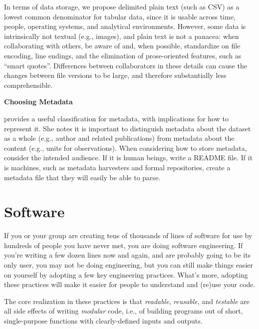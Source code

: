\documentclass[10pt]{article}
\begin{document}
In terms of data storage, we propose delimited plain text (such as CSV)
as a lowest common denominator for tabular data, since it is usable
across time, people, operating systems, and analytical environments.
However, some data is intrinsically not textual (e.g., images),
and plain text is not a panacea: when collaborating with others,
be aware of and, when possible,
standardize on file encoding, line endings, and the
elimination of prose-oriented features, such as ``smart
quotes''. Differences between collaborators in these details can cause
the changes between file versions to be large, and therefore
substantially less comprehensible.

\begin{framed}
\noindent \textbf{Choosing Metadata}

\cite{wickes2015} provides a useful classification for metadata, with implications for
how to represent it. She notes it is important to distinguish
metadata about the dataset as a whole (e.g., author and related publications)
from metadata about the content (e.g., units for observations).
When considering how to store metadata, consider the intended
audience. If it is human beings, write a README file. If it is machines, such as
metadata harvesters and formal repositories, create a metadata file
that they will easily be able to parse.
\end{framed}

\section{Software}\label{sec:software}

If you or your group are creating tens of thousands of lines of
software for use by hundreds of people you have never met, you are
doing software engineering. If you're writing a few dozen lines now
and again, and are probably going to be its only user, you may not be
doing engineering, but you can still make things easier on yourself by
adopting a few key engineering practices. What's more, adopting these
practices will make it easier for people to understand and (re)use
your code.

The core realization in these practices is that \emph{readable},
\emph{reusable}, and \emph{testable} are
all side effects of writing \emph{modular} code, i.e., of building programs out
of short, single-purpose functions with clearly-defined inputs and
outputs.
\end{document}
